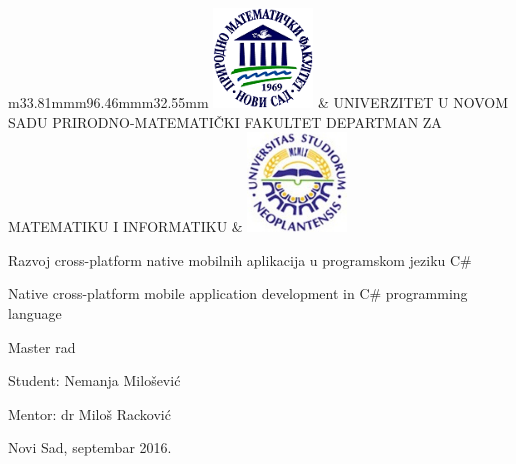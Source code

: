 \documentclass[a4paper]{article}
\title{}
\author{Nemanja Milošević}
\date{2016-08-24T18:38:05.886098120}
\makeatletter
\newcommand\arraybslash{\let\\\@arraycr}
\makeatother
\begin{document}
\begin{center}
\tablehead{}
\begin{supertabular}{m{33.81mm}m{96.46mm}m{32.55mm}}
\centering  \includegraphics[width=26.46mm,height=26.46mm]{msc-img1.png}
 &
\centering UNIVERZITET U NOVOM SADU\newline
PRIRODNO-MATEMATIČKI FAKULTET\newline
DEPARTMAN ZA MATEMATIKU I INFORMATIKU &
\centering\arraybslash 
\includegraphics[width=26.46mm,height=26.46mm]{msc-img2.jpg} \\
\end{supertabular}
\end{center}

\bigskip


\bigskip


\bigskip


\bigskip

{\centering
Razvoj cross-platform native mobilnih aplikacija u programskom jeziku
C\#
\par}

{\centering
Native cross-platform mobile application development in C\# programming
language
\par}

{\centering
\newline
Master rad
\par}


\bigskip

{\centering
Student: Nemanja Milošević
\par}

{\centering
Mentor: dr Miloš Racković
\par}


\bigskip


\bigskip

{\centering
Novi Sad, septembar 2016.
\par}

\setcounter{tocdepth}{10}
\renewcommand\contentsname{Sadržaj}
\tableofcontents
\end{document}
